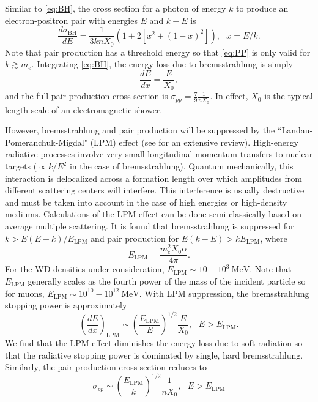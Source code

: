 \documentclass[twocolumn,showpacs,preprintnumbers,amsmath,amssymb,prd]{revtex4}
\def\r{\right)}
\def\l{\left(}
\begin{document}
\begin{appendices}
Similar to \eqref{eq:BH}, the cross section for a photon of energy $k$ to produce an electron-positron pair with energies $E$ and $k-E$ is 
\begin{equation}
\label{eq:PP}
\frac{d \sigma_\text{BH}}{dE} = \frac{1}{3 k n X_0} (1+ 2[x^2+ (1-x)^2]), ~~~ x = E/k.
\end{equation} 
Note that pair production has a threshold energy so that \eqref{eq:PP} is only valid for $k \gtrsim m_e$. Integrating \eqref{eq:BH}, the energy loss due to bremsstrahlung is simply
\begin{equation}
\frac{dE}{dx} = \frac{E}{X_0},
\end{equation}
and the full pair production cross section is $\sigma_{pp} = \frac{7}{9} \frac{1}{n X_0}$. In effect, $X_0$ is the typical length scale of an electromagnetic shower. 

However, bremsstrahlung and pair production will be suppressed by the ``Landau-Pomeranchuk-Migdal" (LPM) effect (see \cite{LPM} for an extensive review). High-energy radiative processes involve very small longitudinal momentum transfers to nuclear targets ($\propto k/E^2$ in the case of bremsstrahlung). Quantum mechanically, this interaction is delocalized across a formation length over which amplitudes from different scattering centers will interfere. This interference is usually destructive and must be taken into account in the case of high energies or high-density mediums. Calculations of the LPM effect can be done semi-classically based on average multiple scattering. It is found that bremsstrahlung is suppressed for $k > E(E-k)/E_\text{LPM}$ and pair production for $E(k-E) > k E_\text{LPM}$, where 
\begin{equation}
\label{eq:LPM}
E_\text{LPM} = \frac{m_e^2 X_0 \alpha}{4 \pi}.
\end{equation}
For the WD densities under consideration, $E_\text{LPM} \sim 10-10^{3} ~\text{MeV}$. Note that $E_\text{LPM}$ generally scales as the fourth power of the mass of the incident particle so for muons, $E_\text{LPM} \sim 10^{10}-10^{12} ~\text{MeV}$. With LPM suppression, the bremsstrahlung stopping power is approximately
\begin{equation}
\label{eq:bremloss}
\l\frac{dE}{dx}\r_\text{LPM} \sim \l\frac{E_\text{LPM}}{E} \r^{1/2} \frac{E}{X_0}, ~~~ E>E_\text{LPM}. 
\end{equation}
We find that the LPM effect diminishes the energy loss due to soft radiation so that the radiative stopping power is dominated by single, hard bremsstrahlung. Similarly, the pair production cross section reduces to 
\begin{equation}
\sigma_{pp} \sim \l\frac{E_\text{LPM}}{k} \r^{1/2} \frac{1}{n X_0}, ~~~ E>E_\text{LPM}
\end{equation}


\end{appendices}
\end{document}
